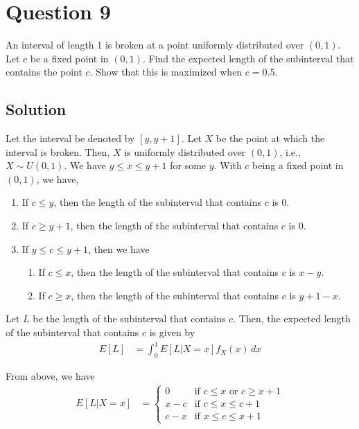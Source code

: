 \section*{Question 9}

An interval of length 1 is broken at a point uniformly distributed over \( (0,1) \).
Let \( c \) be a fixed point in \( (0,1) \).
Find the expected length of the subinterval that contains the point \( c \).
Show that this is maximized when \( c=0.5 \).

\subsection*{Solution}

Let the interval be denoted by \( [y, y+1] \).
Let \( X \) be the point at which the interval is broken.
Then, \( X \) is uniformly distributed over \( (0,1) \), i.e., \( X \sim U(0, 1) \).
We have \( y \leq x \leq y+1 \) for some \( y \).
With \( c \) being a fixed point in \( (0,1) \), we have,
\begin{enumerate}
    \item If \( c \leq y \), then the length of the subinterval that contains \( c \) is \( 0 \).
    \item If \( c \geq y+1 \), then the length of the subinterval that contains \( c \) is \( 0 \).
    \item If \( y \leq c \leq y+1 \), then we have
          \begin{enumerate}
              \item If \( c \leq x \), then the length of the subinterval that contains \( c \) is \( x-y \).
              \item If \( c \geq x \), then the length of the subinterval that contains \( c \) is \( y+1-x \).
          \end{enumerate}
\end{enumerate}

Let \( L \) be the length of the subinterval that contains \( c \).
Then, the expected length of the subinterval that contains \( c \) is given by
\begin{align*}
    E[L] & = \int_{0}^{1} E[L|X=x] f_X(x) \, dx
\end{align*}

From above, we have
\begin{align*}
    E[L|X=x] & = \begin{cases}
                     0   & \text{if } c \leq x \text{ or } c \geq x+1 \\
                     x-c & \text{if } c \leq x \leq c+1               \\
                     c-x & \text{if } x \leq c \leq x+1
                 \end{cases}
\end{align*}

